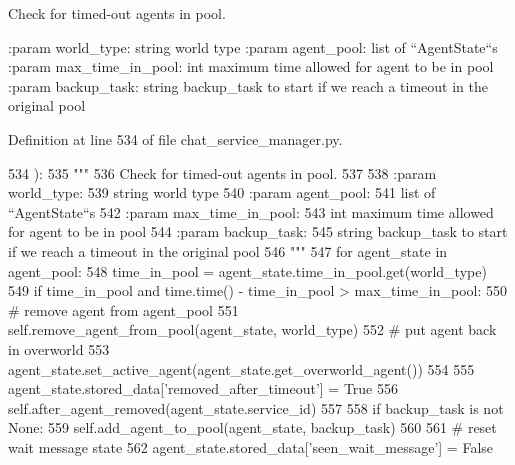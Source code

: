 \begin{DoxyVerb}Check for timed-out agents in pool.

:param world_type:
    string world type
:param agent_pool:
    list of ``AgentState``s
:param max_time_in_pool:
    int maximum time allowed for agent to be in pool
:param backup_task:
    string backup_task to start if we reach a timeout in the original pool
\end{DoxyVerb}
 

Definition at line 534 of file chat\+\_\+service\+\_\+manager.\+py.


\begin{DoxyCode}
534     ):
535         \textcolor{stringliteral}{"""}
536 \textcolor{stringliteral}{        Check for timed-out agents in pool.}
537 \textcolor{stringliteral}{}
538 \textcolor{stringliteral}{        :param world\_type:}
539 \textcolor{stringliteral}{            string world type}
540 \textcolor{stringliteral}{        :param agent\_pool:}
541 \textcolor{stringliteral}{            list of ``AgentState``s}
542 \textcolor{stringliteral}{        :param max\_time\_in\_pool:}
543 \textcolor{stringliteral}{            int maximum time allowed for agent to be in pool}
544 \textcolor{stringliteral}{        :param backup\_task:}
545 \textcolor{stringliteral}{            string backup\_task to start if we reach a timeout in the original pool}
546 \textcolor{stringliteral}{        """}
547         \textcolor{keywordflow}{for} agent\_state \textcolor{keywordflow}{in} agent\_pool:
548             time\_in\_pool = agent\_state.time\_in\_pool.get(world\_type)
549             \textcolor{keywordflow}{if} time\_in\_pool \textcolor{keywordflow}{and} time.time() - time\_in\_pool > max\_time\_in\_pool:
550                 \textcolor{comment}{# remove agent from agent\_pool}
551                 self.remove\_agent\_from\_pool(agent\_state, world\_type)
552                 \textcolor{comment}{# put agent back in overworld}
553                 agent\_state.set\_active\_agent(agent\_state.get\_overworld\_agent())
554 
555                 agent\_state.stored\_data[\textcolor{stringliteral}{'removed\_after\_timeout'}] = \textcolor{keyword}{True}
556                 self.after\_agent\_removed(agent\_state.service\_id)
557 
558                 \textcolor{keywordflow}{if} backup\_task \textcolor{keywordflow}{is} \textcolor{keywordflow}{not} \textcolor{keywordtype}{None}:
559                     self.add\_agent\_to\_pool(agent\_state, backup\_task)
560 
561                 \textcolor{comment}{# reset wait message state}
562                 agent\_state.stored\_data[\textcolor{stringliteral}{'seen\_wait\_message'}] = \textcolor{keyword}{False}

\end{DoxyCode}

